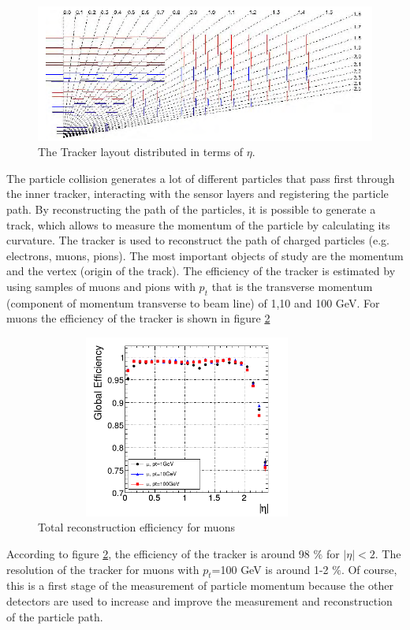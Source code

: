 \begin{figure}[ht]
	\centering
	\includegraphics[scale=0.7]{Chapter2/pixel2.png}
	\caption[The Tracker layout distributed in terms of $\eta$]{The Tracker layout distributed in terms of $\eta$\cite{cms-manual}.}
	\label{pixel2}
\end{figure}
The particle collision generates a lot of different particles that pass first through the inner tracker, interacting with the sensor layers and registering the particle path.
By reconstructing the path of the particles, it is possible to generate a track, which allows to measure the momentum of the particle by calculating its curvature. The tracker is used to reconstruct the path of charged particles (e.g. electrons, muons, pions). The most important objects of study are the momentum and the vertex (origin of the track). The efficiency of the tracker is estimated by using samples of muons and pions with $p_t$ that is the transverse momentum (component of momentum transverse to beam line) of 1,10 and 100 GeV. 
For muons the efficiency of the tracker is shown in figure \ref{efi}
\begin{figure}[ht]
	\centering
	\includegraphics[width=10cm,height=6cm]{Chapter2/tracker.png}
	\caption[Total reconstruction efficiency for muons]{Total reconstruction efficiency for muons\cite{cms-manual} }\label{efi}
\end{figure}

According to figure \ref{efi}, the efficiency of the tracker is around 98 $\%$ for $|\eta|<2$. The resolution of the tracker for muons with $p_t$=100 GeV is around 1-2 $\%$.
Of course, this is a first stage of the measurement of particle momentum because the other detectors are used to increase and improve the measurement and reconstruction of the particle path.

